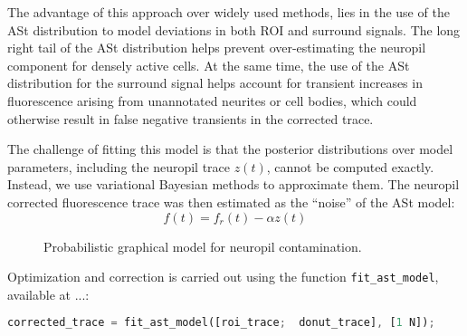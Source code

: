 \documentclass[a4paper]{report}
\begin{document}
The advantage of this approach over widely used methods, lies in the use of the ASt distribution to model deviations in both ROI and surround signals. 
The long right tail of the ASt distribution helps prevent over-estimating the neuropil component for densely active cells. 
At the same time, the use of the ASt distribution for the surround signal helps account for transient increases in fluorescence arising from unannotated neurites or cell bodies, which could otherwise result in false negative transients in the corrected trace.

The challenge of fitting this model is that the posterior distributions over model parameters, including the neuropil trace $z(t)$, cannot be computed exactly. 
Instead, we use variational Bayesian methods to approximate them. The neuropil corrected fluorescence trace was then estimated as the ``noise'' of the ASt model:
\begin{equation}
	f(t) = f_r(t)- \alpha z(t)
\end{equation}

\begin{figure}[b]
  \centering
  \caption{Probabilistic graphical model for neuropil contamination.}
  \label{fig:neuropil}
\end{figure}

Optimization and correction is carried out using the function \texttt{fit\_ast\_model}, available at ...: 
\begin{lstlisting}[language=Octave]
corrected_trace = fit_ast_model([roi_trace;  donut_trace], [1 N]);
\end{lstlisting}
\end{document}
